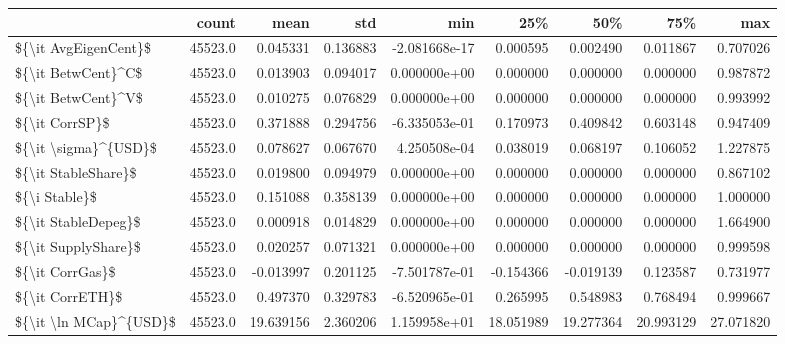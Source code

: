 \begin{tabular}{lrrrrrrrr}
\toprule
{} &    count &       mean &       std &           min &        25\% &        50\% &        75\% &        max \\
\midrule
\$\{\textbackslash it AvgEigenCent\}\$   &  45523.0 &   0.045331 &  0.136883 & -2.081668e-17 &   0.000595 &   0.002490 &   0.011867 &   0.707026 \\
\$\{\textbackslash it BetwCent\}\textasciicircum C\$     &  45523.0 &   0.013903 &  0.094017 &  0.000000e+00 &   0.000000 &   0.000000 &   0.000000 &   0.987872 \\
\$\{\textbackslash it BetwCent\}\textasciicircum V\$     &  45523.0 &   0.010275 &  0.076829 &  0.000000e+00 &   0.000000 &   0.000000 &   0.000000 &   0.993992 \\
\$\{\textbackslash it CorrSP\}\$         &  45523.0 &   0.371888 &  0.294756 & -6.335053e-01 &   0.170973 &   0.409842 &   0.603148 &   0.947409 \\
\$\{\textbackslash it \textbackslash sigma\}\textasciicircum \{USD\}\$   &  45523.0 &   0.078627 &  0.067670 &  4.250508e-04 &   0.038019 &   0.068197 &   0.106052 &   1.227875 \\
\$\{\textbackslash it StableShare\}\$    &  45523.0 &   0.019800 &  0.094979 &  0.000000e+00 &   0.000000 &   0.000000 &   0.000000 &   0.867102 \\
\$\{\textbackslash i Stable\}\$          &  45523.0 &   0.151088 &  0.358139 &  0.000000e+00 &   0.000000 &   0.000000 &   0.000000 &   1.000000 \\
\$\{\textbackslash it StableDepeg\}\$    &  45523.0 &   0.000918 &  0.014829 &  0.000000e+00 &   0.000000 &   0.000000 &   0.000000 &   1.664900 \\
\$\{\textbackslash it SupplyShare\}\$    &  45523.0 &   0.020257 &  0.071321 &  0.000000e+00 &   0.000000 &   0.000000 &   0.000000 &   0.999598 \\
\$\{\textbackslash it CorrGas\}\$        &  45523.0 &  -0.013997 &  0.201125 & -7.501787e-01 &  -0.154366 &  -0.019139 &   0.123587 &   0.731977 \\
\$\{\textbackslash it CorrETH\}\$        &  45523.0 &   0.497370 &  0.329783 & -6.520965e-01 &   0.265995 &   0.548983 &   0.768494 &   0.999667 \\
\$\{\textbackslash it \textbackslash ln MCap\}\textasciicircum \{USD\}\$ &  45523.0 &  19.639156 &  2.360206 &  1.159958e+01 &  18.051989 &  19.277364 &  20.993129 &  27.071820 \\
\bottomrule
\end{tabular}
